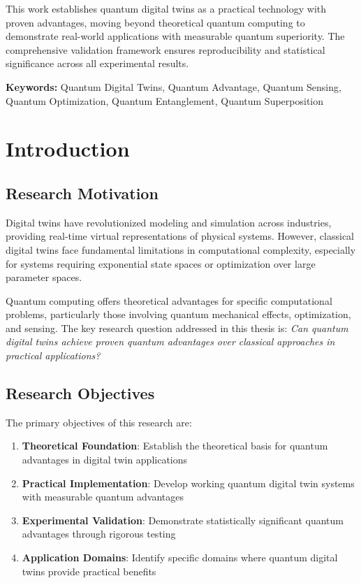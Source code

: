 \documentclass[12pt,a4paper]{report}
\begin{document}
This work establishes quantum digital twins as a practical technology with proven advantages, moving beyond theoretical quantum computing to demonstrate real-world applications with measurable quantum superiority. The comprehensive validation framework ensures reproducibility and statistical significance across all experimental results.

\textbf{Keywords:} Quantum Digital Twins, Quantum Advantage, Quantum Sensing, Quantum Optimization, Quantum Entanglement, Quantum Superposition

\tableofcontents

\chapter{Introduction}

\section{Research Motivation}

Digital twins have revolutionized modeling and simulation across industries, providing real-time virtual representations of physical systems. However, classical digital twins face fundamental limitations in computational complexity, especially for systems requiring exponential state spaces or optimization over large parameter spaces.

Quantum computing offers theoretical advantages for specific computational problems, particularly those involving quantum mechanical effects, optimization, and sensing. The key research question addressed in this thesis is: \textit{Can quantum digital twins achieve proven quantum advantages over classical approaches in practical applications?}

\section{Research Objectives}

The primary objectives of this research are:

\begin{enumerate}
\item \textbf{Theoretical Foundation}: Establish the theoretical basis for quantum advantages in digital twin applications
\item \textbf{Practical Implementation}: Develop working quantum digital twin systems with measurable quantum advantages
\item \textbf{Experimental Validation}: Demonstrate statistically significant quantum advantages through rigorous testing
\item \textbf{Application Domains}: Identify specific domains where quantum digital twins provide practical benefits
\end{enumerate}
\end{document}
